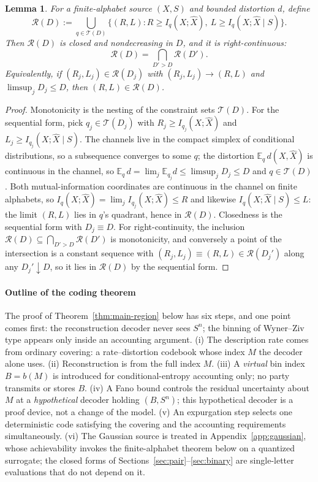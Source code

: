 \documentclass[11pt,onecolumn]{IEEEtran}
\newtheorem{lemma}[theorem]{Lemma}
\newcommand{\E}{\mathbb{E}}
\newcommand{\hX}{\widehat{X}}
\begin{document}
\begin{lemma}
\label{lem:rightcont}
For a finite-alphabet source $(X,S)$ and bounded distortion $d$, define
\[
\mathcal R(D):=\bigcup_{q\in\mathcal T(D)}
\bigl\{(R,L):R\ge I_q(X;\hX),\ L\ge I_q(X;\hX\mid S)\bigr\}.
\]
Then $\mathcal R(D)$ is closed and nondecreasing in $D$, and it is
right-continuous:
\[
\mathcal R(D)=\bigcap_{D'>D}\mathcal R(D').
\]
Equivalently, if $(R_j,L_j)\in\mathcal R(D_j)$ with
$(R_j,L_j)\to(R,L)$ and $\limsup_jD_j\le D$, then
$(R,L)\in\mathcal R(D)$.
\end{lemma}

\begin{proof}
Monotonicity is the nesting of the constraint sets $\mathcal T(D)$. For
the sequential form, pick $q_j\in\mathcal T(D_j)$ with
$R_j\ge I_{q_j}(X;\hX)$ and $L_j\ge I_{q_j}(X;\hX\mid S)$. The channels
live in the compact simplex of conditional distributions, so a
subsequence converges to some $q$; the distortion $\E_q\,d(X,\hX)$ is
continuous in the channel, so
$\E_q\,d=\lim_j\E_{q_j}d\le\limsup_jD_j\le D$ and $q\in\mathcal T(D)$.
Both mutual-information coordinates are continuous in the channel on
finite alphabets, so $I_q(X;\hX)=\lim_jI_{q_j}(X;\hX)\le R$ and
likewise $I_q(X;\hX\mid S)\le L$: the limit $(R,L)$ lies in $q$'s
quadrant, hence in $\mathcal R(D)$. Closedness is the sequential form
with $D_j\equiv D$. For right-continuity, the inclusion
$\mathcal R(D)\subseteq\bigcap_{D'>D}\mathcal R(D')$ is monotonicity,
and conversely a point of the intersection is a constant sequence with
$(R_j,L_j)\equiv(R,L)\in\mathcal R(D_j')$ along any $D_j'\downarrow D$,
so it lies in $\mathcal R(D)$ by the sequential form.
\end{proof}

\paragraph*{Outline of the coding theorem}
The proof of Theorem~\ref{thm:main-region} below has six steps, and one
point comes first: the reconstruction
decoder never sees $S^n$; the binning of Wyner--Ziv type appears only
inside an accounting argument. (i) The description rate comes from
ordinary covering: a rate--distortion codebook whose index $M$ the
decoder alone uses. (ii) Reconstruction is from the full index $M$.
(iii) A \emph{virtual} bin index $B=b(M)$ is introduced for
conditional-entropy accounting only; no party transmits or stores $B$.
(iv) A Fano bound controls the residual uncertainty about $M$ at a
\emph{hypothetical} decoder holding $(B,S^n)$; this hypothetical decoder
is a proof device, not a change of the model. (v) An expurgation step
selects one deterministic code satisfying the covering and the
accounting requirements simultaneously. (vi) The Gaussian source is
treated in Appendix~\ref{app:gaussian}, whose achievability invokes the
finite-alphabet theorem below on a quantized surrogate; the closed
forms of Sections~\ref{sec:pair}--\ref{sec:binary} are single-letter
evaluations that do not depend on it.
\end{document}
